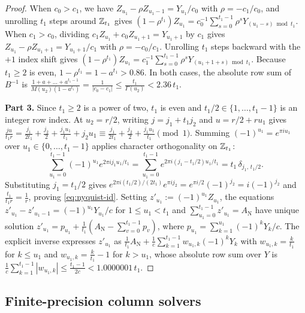 \begin{proof}
When $c_0 > c_1$, we have $Z_{u_1} - \rho Z_{u_1 - 1} = Y_{u_1}/c_0$ with $\rho = -c_1/c_0$, and unrolling $t_1$ steps around $\mathbb{Z}_{t_1}$ gives $(1 - \rho^{t_1})Z_{u_1} = c_0^{-1}\sum_{s=0}^{t_1-1} \rho^s Y_{(u_1 - s)\bmod t_1}$. When $c_1 > c_0$, dividing $c_1 Z_{u_1} + c_0 Z_{u_1 + 1} = Y_{u_1 + 1}$ by $c_1$ gives $Z_{u_1} - \rho Z_{u_1 + 1} = Y_{u_1 + 1}/c_1$ with $\rho = -c_0/c_1$. Unrolling $t_1$ steps backward with the $+1$ index shift gives $(1 - \rho^{t_1})Z_{u_1} = c_1^{-1}\sum_{s=0}^{t_1-1} \rho^s Y_{(u_1 + 1 + s)\bmod t_1}$. Because $t_1 \ge 2$ is even, $1 - \rho^{t_1} = 1 - a^{t_1} > 0.86$. In both cases, the absolute row sum of $B^{-1}$ is $\frac{1 + a + \dots + a^{t_1-1}}{M(u_2)(1 - a^{t_1})} = \frac{1}{|c_0 - c_1|} \le \frac{t_1}{\Gamma(u_2)} < 2.36 \, t_1$.

\textbf{Part 3.} Since $t_1 \ge 2$ is a power of two, $t_1$ is even and $t_1 / 2 \in \{1, \dots, t_1 - 1\}$ is an integer row index. At $u_2 = r/2$, writing $j = j_1 + t_1 j_2$ and $u = r/2 + r u_1$ gives $\frac{j u}{t_1 r} = \frac{j_1}{2 t_1} + \frac{j_2}{2} + \frac{j_1 u_1}{t_1} + j_2 u_1 \equiv \frac{j_1}{2 t_1} + \frac{j_2}{2} + \frac{j_1 u_1}{t_1} \pmod{1}$. Summing $(-1)^{u_1} = e^{\pi i u_1}$ over $u_1 \in \{0, \dots, t_1-1\}$ applies character orthogonality on $\mathbb{Z}_{t_1}$:
\[
  \sum_{u_1=0}^{t_1-1} (-1)^{u_1} e^{2\pi i j_1 u_1 / t_1} = \sum_{u_1=0}^{t_1-1} e^{2\pi i (j_1 - t_1/2) u_1 / t_1} = t_1 \, \delta_{j_1, \, t_1/2}.
\]
Substituting $j_1 = t_1/2$ gives $e^{2\pi i (t_1/2)/(2 t_1)} e^{\pi i j_2} = e^{\pi i / 2} (-1)^{j_2} = i (-1)^{j_2}$ and $\frac{t_1}{t_1 r} = \frac{1}{r}$, proving \eqref{eq:nyquist-id}. Setting $z'_{u_1} := (-1)^{u_1} Z_{u_1}$, the equations $z'_{u_1} - z'_{u_1 - 1} = (-1)^{u_1} Y_{u_1} / c$ for $1 \le u_1 < t_1$ and $\sum_{u_1=0}^{t_1-1} z'_{u_1} = A_{\mathrm{N}}$ have unique solution $z'_{u_1} = p_{u_1} + \frac{1}{t_1}(A_{\mathrm{N}} - \sum_{v=0}^{t_1-1} p_v)$, where $p_{u_1} = \sum_{k=1}^{u_1} (-1)^k Y_k / c$. The explicit inverse expresses $z'_{u_1}$ as $\frac{1}{t_1} A_{\mathrm{N}} + \frac{1}{c}\sum_{k=1}^{t_1-1} w_{u_1, k} (-1)^k Y_k$ with $w_{u_1, k} = \frac{k}{t_1}$ for $k \le u_1$ and $w_{u_1, k} = \frac{k}{t_1} - 1$ for $k > u_1$, whose absolute row sum over $Y$ is $\frac{1}{c}\sum_{k=1}^{t_1-1} |w_{u_1, k}| \le \frac{t_1 - 1}{2 c} < 1.0000001 \, t_1$.
\end{proof}

\subsection{Finite-precision column solvers}\label{sec:solvers}

